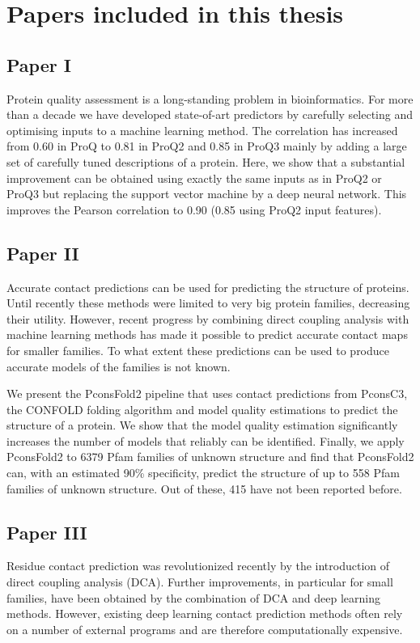 \chapter{Papers included in this thesis}


\section*{Paper I}
Protein quality assessment is a long-standing problem in bioinformatics. For more than a decade we have developed state-of-art predictors by carefully selecting and optimising inputs to a machine learning method. The correlation has increased from 0.60 in ProQ to 0.81 in ProQ2 and 0.85 in ProQ3 mainly by adding a large set of carefully tuned descriptions of a protein. Here, we show that a substantial improvement can be obtained using exactly the same inputs as in ProQ2 or ProQ3 but replacing the support vector machine by a deep neural network. This improves the Pearson correlation to 0.90 (0.85 using ProQ2 input features).

\section*{Paper II}

Accurate contact predictions can be used for predicting the structure of proteins. Until recently these methods were limited to very big protein families, decreasing their utility. However, recent progress by combining direct coupling analysis with machine learning methods has made it possible to predict accurate contact maps for smaller families. To what extent these predictions can be used to produce accurate models of the families is not known.

We present the PconsFold2 pipeline that uses contact predictions from PconsC3, the CONFOLD folding algorithm and model quality estimations to predict the structure of a protein. We show that the model quality estimation significantly increases the number of models that reliably can be identified. Finally, we apply PconsFold2 to 6379 Pfam families of unknown structure and find that PconsFold2 can, with an estimated 90\% specificity, predict the structure of up to 558 Pfam families of unknown structure. Out of these, 415 have not been reported before.

\section*{Paper III}
Residue contact prediction was revolutionized recently by the introduction of direct coupling analysis (DCA). Further improvements, in particular for small families, have been obtained by the combination of DCA and deep learning methods. However, existing deep learning contact prediction methods often rely on a number of external programs and are therefore computationally expensive.


